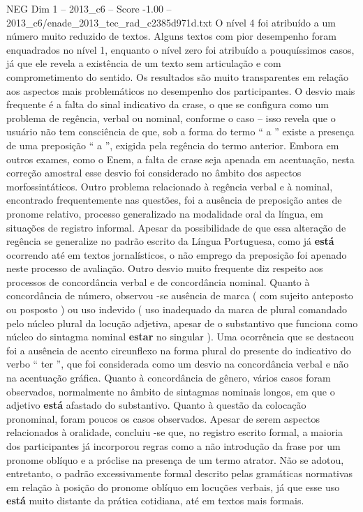 \begin{textsample}{NEG Dim 1 – 2013\_c6 – Score -1.00 – 2013\_c6/enade\_2013\_tec\_rad\_c2385d971d.txt}
O nível 4 foi atribuído a um número muito reduzido de textos.
Alguns textos com pior desempenho foram enquadrados no nível 1, enquanto o nível zero foi atribuído a pouquíssimos casos, já que ele revela a existência de um texto sem articulação e com comprometimento do sentido.
Os resultados são muito transparentes em relação aos aspectos mais problemáticos no desempenho dos participantes.
O desvio mais frequente é a falta do sinal indicativo da crase, o que se configura como um problema de regência, verbal ou nominal, conforme o caso – isso revela que o usuário não tem consciência de que, sob a forma do termo “ a ” existe a presença de uma preposição “ a ”, exigida pela regência do termo anterior.
Embora em outros exames, como o Enem, a falta de crase seja apenada em acentuação, nesta correção amostral esse desvio foi considerado no âmbito dos aspectos morfossintáticos.
Outro problema relacionado à regência verbal e à nominal, encontrado frequentemente nas questões, foi a ausência de preposição antes de pronome relativo, processo generalizado na modalidade oral da língua, em situações de registro informal.
Apesar da possibilidade de que essa alteração de regência se generalize no padrão escrito da Língua Portuguesa, como já \textbf{está} ocorrendo até em textos jornalísticos, o não emprego da preposição foi apenado neste processo de avaliação.
Outro desvio muito frequente diz respeito aos processos de concordância verbal e de concordância nominal.
Quanto à concordância de número, observou -se ausência de marca ( com sujeito anteposto ou posposto ) ou uso indevido ( uso inadequado da marca de plural comandado pelo núcleo plural da locução adjetiva, apesar de o substantivo que funciona como núcleo do sintagma nominal \textbf{estar} no singular ).
Uma ocorrência que se destacou foi a ausência de acento circunflexo na forma plural do presente do indicativo do verbo “ ter ”, que foi considerada como um desvio na concordância verbal e não na acentuação gráfica.
Quanto à concordância de gênero, vários casos foram observados, normalmente no âmbito de sintagmas nominais longos, em que o adjetivo \textbf{está} afastado do substantivo.
Quanto à questão da colocação pronominal, foram poucos os casos observados.
Apesar de serem aspectos relacionados à oralidade, concluiu -se que, no registro escrito formal, a maioria dos participantes já incorporou regras como a não introdução da frase por um pronome oblíquo e a próclise na presença de um termo atrator.
Não se adotou, entretanto, o padrão excessivamente formal descrito pelas gramáticas normativas em relação à posição do pronome oblíquo em locuções verbais, já que esse uso \textbf{está} muito distante da prática cotidiana, até em textos mais formais.

\end{textsample}
